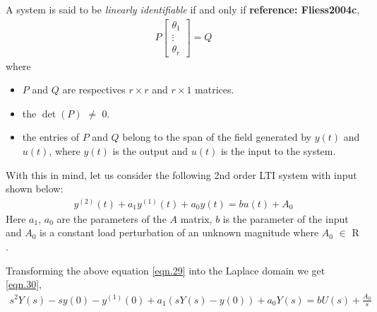 \documentclass{article}
\begin{document}
\par A system is said to be \textit{linearly identifiable} if and only if \textbf{reference: Fliess2004c}, 
\begin{equation}\label{eqn.28.1}
\begin{split}
P\begin{bmatrix} \theta_1 \\ \vdots \\ \theta_r \end{bmatrix} = Q
\end{split}
\end{equation}
where
\begin{itemize}
\item $P$ and $Q$ are respectives $r \times r$ and $r \times 1$ matrices.
\item the $\det(P)$ $\neq$ $0$. 
\item the entries of $P$ and $Q$ belong to the span of the field generated by $y(t)$ and $u(t)$, where $y(t)$ is the output and $u(t)$ is the input to the system.
\end{itemize}
With this in mind, let us consider the following 2nd order LTI system with input shown below:
\begin{equation}\label{eqn.29}
\begin{split}
y^{(2)}(t)+a_{1}y^{(1)}(t)+a_{0}y(t) = b u(t) +A_{0}
\end{split}
\end{equation}
Here $a_{1}$, $a_{0}$ are the parameters of the $A$ matrix, $b$ is the parameter of the input and $A_{0}$ is a constant load perturbation of an unknown magnitude where $A_{0}$ $\in$ $\mathrm{R}$.
\par Transforming the above equation \eqref{eqn.29} into the Laplace domain we get \eqref{eqn.30},
\begin{equation}\label{eqn.30}
\begin{split}
s^2Y(s) - sy(0) - y^{(1)}(0) + a_{1}(sY(s)-y(0)) + a_{0}Y(s) = b U(s) + \frac{A_{0}}{s}
\end{split}
\end{equation}
\end{document}
